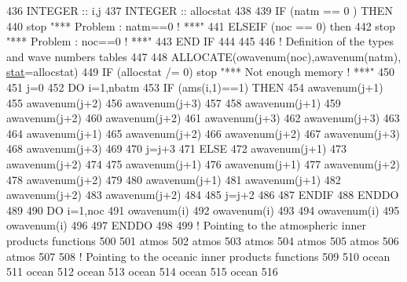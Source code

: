 \begin{DoxyCode}
436     \textcolor{keywordtype}{INTEGER} :: i,j
437     \textcolor{keywordtype}{INTEGER} :: allocstat
438 
439     \textcolor{keywordflow}{IF} (natm == 0 ) \textcolor{keywordflow}{THEN}
440        stop \textcolor{stringliteral}{"*** Problem : natm==0 ! ***"}
441     \textcolor{keywordflow}{ELSEIF} (noc == 0) \textcolor{keywordflow}{then}
442        stop \textcolor{stringliteral}{"*** Problem : noc==0 ! ***"}
443 \textcolor{keywordflow}{    END IF}
444 
445 
446     \textcolor{comment}{! Definition of the types and wave numbers tables}
447 
448     \textcolor{keyword}{ALLOCATE}(owavenum(noc),awavenum(natm), \hyperlink{namespacestat}{stat}=allocstat)
449     \textcolor{keywordflow}{IF} (allocstat /= 0) stop \textcolor{stringliteral}{"*** Not enough memory ! ***"}
450 
451     j=0
452     \textcolor{keywordflow}{DO} i=1,nbatm
453        \textcolor{keywordflow}{IF} (ams(i,1)==1) \textcolor{keywordflow}{THEN}
454           awavenum(j+1)%
455           awavenum(j+2)%
456           awavenum(j+3)%
457 
458           awavenum(j+1)%
459           awavenum(j+2)%
460           awavenum(j+2)%
461           awavenum(j+3)%
462           awavenum(j+3)%
463 
464           awavenum(j+1)%
465           awavenum(j+2)%
466           awavenum(j+2)%
467           awavenum(j+3)%
468           awavenum(j+3)%
469 
470           j=j+3
471        \textcolor{keywordflow}{ELSE}
472           awavenum(j+1)%
473           awavenum(j+2)%
474 
475           awavenum(j+1)%
476           awavenum(j+1)%
477           awavenum(j+2)%
478           awavenum(j+2)%
479 
480           awavenum(j+1)%
481           awavenum(j+1)%
482           awavenum(j+2)%
483           awavenum(j+2)%
484 
485           j=j+2
486 
487 \textcolor{keywordflow}{       ENDIF}
488 \textcolor{keywordflow}{    ENDDO}
489 
490     \textcolor{keywordflow}{DO} i=1,noc
491        owavenum(i)%
492        owavenum(i)%
493 
494        owavenum(i)%
495        owavenum(i)%
496 
497 \textcolor{keywordflow}{    ENDDO}
498 
499     \textcolor{comment}{! Pointing to the atmospheric inner products functions}
500 
501     atmos%
502     atmos%
503     atmos%
504     atmos%
505     atmos%
506     atmos%
507 
508     \textcolor{comment}{! Pointing to the oceanic inner products functions}
509 
510     ocean%
511     ocean%
512     ocean%
513     ocean%
514     ocean%
515     ocean%
516 
\end{DoxyCode}
